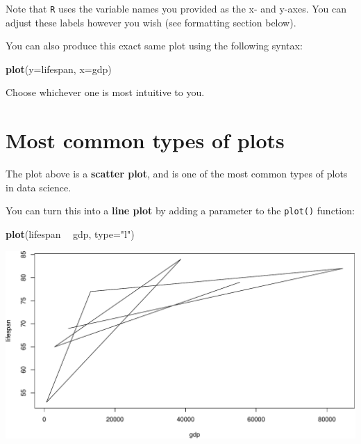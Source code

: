 \documentclass[]{book}
\newenvironment{Shaded}{\begin{snugshade}}{\end{snugshade}}
\newcommand{\DataTypeTok}[1]{\textcolor[rgb]{0.13,0.29,0.53}{#1}}
\newcommand{\KeywordTok}[1]{\textcolor[rgb]{0.13,0.29,0.53}{\textbf{#1}}}
\newcommand{\NormalTok}[1]{#1}
\newcommand{\OperatorTok}[1]{\textcolor[rgb]{0.81,0.36,0.00}{\textbf{#1}}}
\newcommand{\StringTok}[1]{\textcolor[rgb]{0.31,0.60,0.02}{#1}}
\begin{document}
Note that \texttt{R} uses the variable names you provided as the x- and y-axes. You can adjust these labels however you wish (see formatting section below).

You can also produce this exact same plot using the following syntax:

\begin{Shaded}
\begin{Highlighting}[]
\KeywordTok{plot}\NormalTok{(}\DataTypeTok{y=}\NormalTok{lifespan, }\DataTypeTok{x=}\NormalTok{gdp)}
\end{Highlighting}
\end{Shaded}

Choose whichever one is most intuitive to you.

\hypertarget{most-common-types-of-plots}{%
\section*{Most common types of plots}\label{most-common-types-of-plots}}

The plot above is a \textbf{scatter plot}, and is one of the most common types of plots in data science.

You can turn this into a \textbf{line plot} by adding a parameter to the \texttt{plot()} function:

\begin{Shaded}
\begin{Highlighting}[]
\KeywordTok{plot}\NormalTok{(lifespan }\OperatorTok{~}\StringTok{ }\NormalTok{gdp, }\DataTypeTok{type=}\StringTok{"l"}\NormalTok{)}
\end{Highlighting}
\end{Shaded}

\includegraphics{figures/unnamed-chunk-223-1.pdf}
\end{document}
